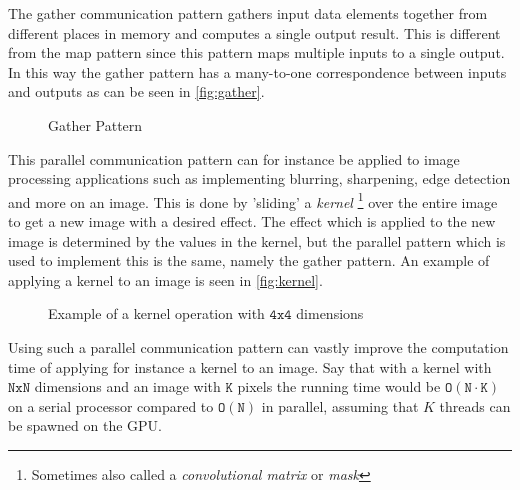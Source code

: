 The gather communication pattern gathers input data elements together from different places in memory and computes a single output result.
This is different from the map pattern since this pattern maps multiple inputs to a single output.
In this way the gather pattern has a many-to-one correspondence between inputs and outputs as can be seen in \autoref{fig:gather}.

\begin{figure}[ht]
	\centering
	\caption{Gather Pattern}
	\label{fig:gather}
\end{figure}

This parallel communication pattern can for instance be applied to image processing applications such as implementing blurring, sharpening, edge detection and more on an image.
This is done by 'sliding' a \textit{kernel} \footnote{Sometimes also called a \textit{convolutional matrix} or \textit{mask}} over the entire image to get a new image with a desired effect.
The effect which is applied to the new image is determined by the values in the kernel, but the parallel pattern which is used to implement this is the same, namely the gather pattern.
An example of applying a kernel to an image is seen in \autoref{fig:kernel}.
\begin{figure}[ht]
	\centering
	\caption{Example of a kernel operation with $\mathtt{4x4}$ dimensions}
	\label{fig:kernel}
\end{figure}
Using such a parallel communication pattern can vastly improve the computation time of applying for instance a kernel to an image.
Say that with a kernel with $\mathtt{NxN}$ dimensions and an image with $\mathtt{K}$ pixels the running time would be $\mathtt{O(N\cdot K)}$ on a serial processor compared to $\mathtt{O(N)}$ in parallel, assuming that $K$ threads can be spawned on the GPU.

